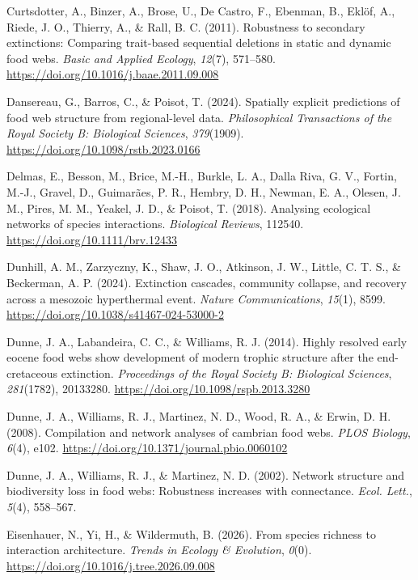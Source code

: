\documentclass[
]{article}
\newlength{\cslhangindent}
\newenvironment{CSLReferences}[2] %
 {\begin{list}{}{%
  \setlength{\itemindent}{0pt}
  \setlength{\leftmargin}{0pt}
  \setlength{\parsep}{0pt}
  \ifodd #1
   \setlength{\leftmargin}{\cslhangindent}
   \setlength{\itemindent}{-1\cslhangindent}
  \fi
  \setlength{\itemsep}{#2\baselineskip}}}
 {\end{list}}
\begin{document}
\begin{CSLReferences}{1}{0}
Curtsdotter, A., Binzer, A., Brose, U., De Castro, F., Ebenman, B.,
Eklöf, A., Riede, J. O., Thierry, A., \& Rall, B. C. (2011). Robustness
to secondary extinctions: Comparing trait-based sequential deletions in
static and dynamic food webs. \emph{Basic and Applied Ecology},
\emph{12}(7), 571--580. \url{https://doi.org/10.1016/j.baae.2011.09.008}

Dansereau, G., Barros, C., \& Poisot, T. (2024). Spatially explicit
predictions of food web structure from regional-level data.
\emph{Philosophical Transactions of the Royal Society B: Biological
Sciences}, \emph{379}(1909).
\url{https://doi.org/10.1098/rstb.2023.0166}

Delmas, E., Besson, M., Brice, M.-H., Burkle, L. A., Dalla Riva, G. V.,
Fortin, M.-J., Gravel, D., Guimarães, P. R., Hembry, D. H., Newman, E.
A., Olesen, J. M., Pires, M. M., Yeakel, J. D., \& Poisot, T. (2018).
Analysing ecological networks of species interactions. \emph{Biological
Reviews}, 112540. \url{https://doi.org/10.1111/brv.12433}

Dunhill, A. M., Zarzyczny, K., Shaw, J. O., Atkinson, J. W., Little, C.
T. S., \& Beckerman, A. P. (2024). Extinction cascades, community
collapse, and recovery across a mesozoic hyperthermal event.
\emph{Nature Communications}, \emph{15}(1), 8599.
\url{https://doi.org/10.1038/s41467-024-53000-2}

Dunne, J. A., Labandeira, C. C., \& Williams, R. J. (2014). Highly
resolved early eocene food webs show development of modern trophic
structure after the end-cretaceous extinction. \emph{Proceedings of the
Royal Society B: Biological Sciences}, \emph{281}(1782), 20133280.
\url{https://doi.org/10.1098/rspb.2013.3280}

Dunne, J. A., Williams, R. J., Martinez, N. D., Wood, R. A., \& Erwin,
D. H. (2008). Compilation and network analyses of cambrian food webs.
\emph{PLOS Biology}, \emph{6}(4), e102.
\url{https://doi.org/10.1371/journal.pbio.0060102}

Dunne, J. A., Williams, R. J., \& Martinez, N. D. (2002). Network
structure and biodiversity loss in food webs: Robustness increases with
connectance. \emph{Ecol. Lett.}, \emph{5}(4), 558--567.

Eisenhauer, N., Yi, H., \& Wildermuth, B. (2026). From species richness
to interaction architecture. \emph{Trends in Ecology \& Evolution},
\emph{0}(0). \url{https://doi.org/10.1016/j.tree.2026.09.008}


\end{CSLReferences}
\end{document}

